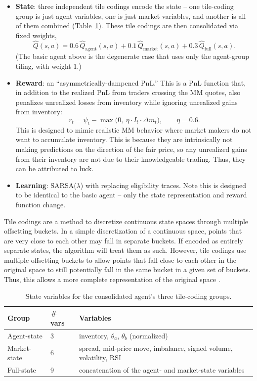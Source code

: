 \documentclass{article}
\begin{document}
\begin{itemize}
  \item \textbf{State}: three independent tile codings encode the state -- one tile-coding group is just agent variables, one is just market variables, and another is all of them combined (Table~\ref{tab:state-vars}). These tile codings are then consolidated via fixed weights,
    \begin{equation}
    \hat{Q}(s,a) = 0.6\,\hat{Q}_{\text{agent}}(s,a) + 0.1\,\hat{Q}_{\text{market}}(s,a) + 0.3\,\hat{Q}_{\text{full}}(s,a).
    \end{equation}
    (The basic agent above is the degenerate case that uses only the agent-group tiling, with weight 1.)
  \item \textbf{Reward}: an ``asymmetrically-dampened PnL.'' This is a PnL function that, in addition to the realized PnL from traders crossing the MM quotes, also penalizes unrealized losses from inventory while ignoring unrealized gains from inventory:
    \begin{equation}
    r_t = \psi_t - \max\big(0,\ \eta \cdot I_t \cdot \Delta m_t\big), \qquad \eta = 0.6.
    \end{equation}
    This is designed to mimic realistic MM behavior where market makers do not want to accumulate inventory. This is because they are intrinsically not making predictions on the direction of the fair price, so any unrealized gains from their inventory are not due to their knowledgeable trading. Thus, they can be attributed to luck.
  \item \textbf{Learning}: SARSA($\lambda$) with replacing eligibility traces. Note this is designed to be identical to the basic agent -- only the state representation and reward function change.
\end{itemize}

Tile codings are a method to discretize continuous state spaces through multiple offsetting buckets. In a simple discretization of a continuous space, points that are very close to each other may fall in separate buckets. If encoded as entirely separate states, the algorithm will treat them as such. However, tile codings use multiple offsetting buckets to allow points that fall close to each other in the original space to still potentially fall in the same bucket in a given set of buckets. Thus, this allows a more complete representation of the original space \citep{suttonbarto2018}.

\begin{table}[h]
\centering
\caption{State variables for the consolidated agent's three tile-coding groups.}
\label{tab:state-vars}
\begin{tabular}{@{}lll@{}}
\toprule
Group & \# vars & Variables \\
\midrule
Agent-state  & 3 & inventory, $\theta_a$, $\theta_b$ (normalized) \\
Market-state & 6 & spread, mid-price move, imbalance, signed volume, volatility, RSI \\
Full-state   & 9 & concatenation of the agent- and market-state variables \\
\bottomrule
\end{tabular}
\end{table}
\end{document}
